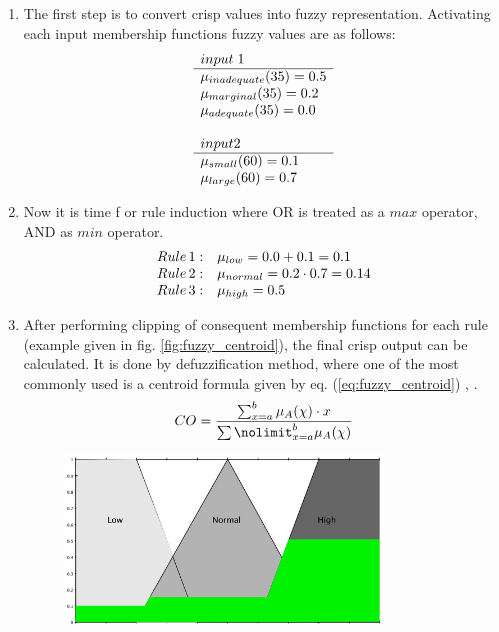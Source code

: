 \begin{enumerate}
    \item The first step is to convert crisp values into fuzzy representation.
        Activating each input membership functions fuzzy values are as follows:
        $$
            \begin{array}[H]{l}
                input \;1 \\ \hline
                \mu_{inadequate}(35) = 0.5 \\
                \mu_{marginal}(35) = 0.2 \\
                \mu_{adequate}(35) = 0.0 \\ \\
                input 2 \\ \hline
                \mu_{small}(60) = 0.1 \\
                \mu_{large}(60) = 0.7 \\ 
            \end{array}
        $$
    \item Now it is time f or rule induction where OR is treated as a $max$ operator, AND
        as $min$ operator. 
        $$
            \begin{array}[H]{ll}
                Rule \,1: & \mu_{low} = 0.0 + 0.1 = 0.1 \\
                Rule \,2: & \mu_{normal} = 0.2\cdot 0.7 = 0.14 \\
                Rule \,3: & \mu_{high} = 0.5 \\
            \end{array}
        $$
    \item After performing clipping of consequent membership functions for each
        rule (example given in fig. \ref{fig:fuzzy_centroid}), the final crisp output can be calculated. It is done by
        defuzzification method, where one of the most commonly used is a centroid
        formula given by eq. (\ref{eq:fuzzy_centroid}) \cite{bib0}, \cite{bib1}.
        \begin{equation}
            CO = \frac{\sum\nolimits_{x=a}^{b}\mu_A(\chi)\cdot
            x}{\sum\nolimit_{x=a}^{b}\mu_A(\chi)}
            \label{eq:fuzzy_centroid}
        \end{equation}
        \begin{figure}[H]
            \begin{center}
                \includegraphics[width=0.8\textwidth, height=0.5\textwidth]{fig/fuzzy_centroid.png}

\end{center}
\end{figure}
\end{enumerate}
